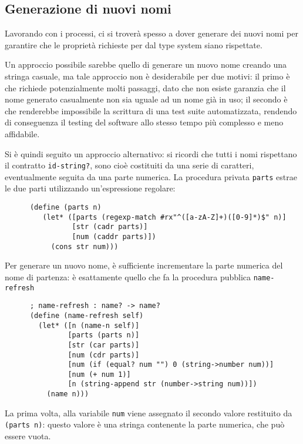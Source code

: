\subsection{Generazione di nuovi nomi}

Lavorando con i processi, ci si trover\`a spesso a dover generare dei
nuovi nomi per garantire che le propriet\`a richieste per dal type
system siano rispettate.

Un approccio possibile sarebbe quello di generare un nuovo nome creando
una stringa casuale, ma tale approccio non \`e desiderabile per due
motivi: il primo \`e che richiede potenzialmente molti passaggi, dato
che non esiste garanzia che il nome generato casualmente non sia uguale
ad un nome gi\`a in uso; il secondo \`e che renderebbe impossibile la
scrittura di una test suite automatizzata, rendendo di conseguenza il
testing del software allo stesso tempo pi\`u complesso e meno affidabile.

Si \`e quindi seguito un approccio alternativo: si ricordi che tutti i
nomi rispettano il contratto \lstinline{id-string?}, sono cio\`e
costituiti da una serie di caratteri, eventualmente seguita da una parte
numerica. La procedura privata \lstinline{parts} estrae le due parti
utilizzando un'espressione regolare:

\begin{lstlisting}
      (define (parts n)
         (let* ([parts (regexp-match #rx"^([a-zA-Z]+)([0-9]*)$" n)]
                [str (cadr parts)]
                [num (caddr parts)])
           (cons str num)))
\end{lstlisting}

Per generare un nuovo nome, \`e sufficiente incrementare la parte numerica
del nome di partenza: \`e esattamente quello che fa la procedura pubblica
\lstinline{name-refresh}

\begin{lstlisting}
      ; name-refresh : name? -> name?
      (define (name-refresh self)
        (let* ([n (name-n self)]
               [parts (parts n)]
               [str (car parts)]
               [num (cdr parts)]
               [num (if (equal? num "") 0 (string->number num))]
               [num (+ num 1)]
               [n (string-append str (number->string num))])
          (name n)))
\end{lstlisting}

La prima volta, alla variabile \lstinline{num} viene assegnato il secondo
valore restituito da \lstinline{(parts n)}: questo valore \`e una stringa
contenente la parte numerica, che pu\`o essere vuota.

